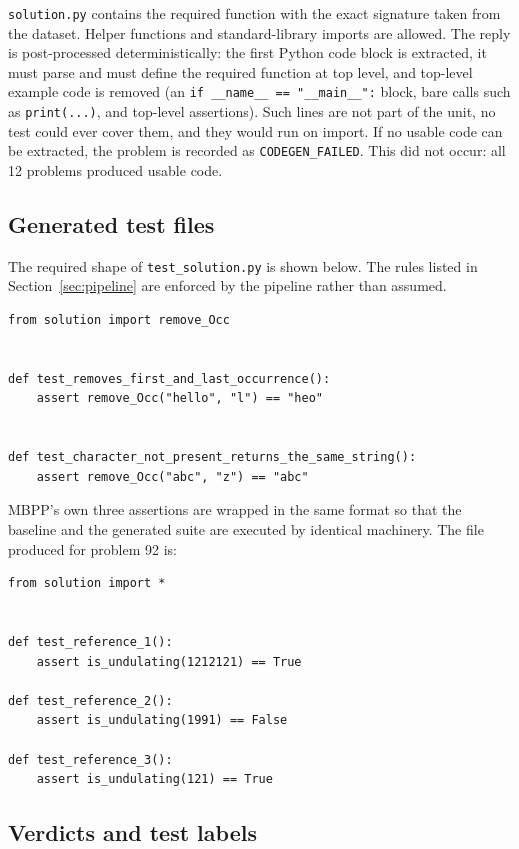 \documentclass[11pt,a4paper]{article}
\begin{document}
\texttt{solution.py} contains the required function with the exact signature taken from the dataset. Helper
functions and standard-library imports are allowed. The reply is post-processed deterministically: the first
Python code block is extracted, it must parse and must define the required function at top level, and
top-level example code is removed (an \texttt{if \_\_name\_\_ == "\_\_main\_\_":} block, bare calls such as
\texttt{print(...)}, and top-level assertions). Such lines are not part of the unit, no test could ever cover
them, and they would run on import. If no usable code can be extracted, the problem is recorded as
\texttt{CODEGEN\_FAILED}. This did not occur: all 12 problems produced usable code.

\subsection{Generated test files}

The required shape of \texttt{test\_solution.py} is shown below. The rules listed in
Section~\ref{sec:pipeline} are enforced by the pipeline rather than assumed.

\begin{lstlisting}[style=py]
from solution import remove_Occ


def test_removes_first_and_last_occurrence():
    assert remove_Occ("hello", "l") == "heo"


def test_character_not_present_returns_the_same_string():
    assert remove_Occ("abc", "z") == "abc"
\end{lstlisting}

MBPP's own three assertions are wrapped in the same format so that the baseline and the generated suite are
executed by identical machinery. The file produced for problem 92 is:

\begin{lstlisting}[style=py]
from solution import *


def test_reference_1():
    assert is_undulating(1212121) == True

def test_reference_2():
    assert is_undulating(1991) == False

def test_reference_3():
    assert is_undulating(121) == True
\end{lstlisting}

\subsection{Verdicts and test labels}
\end{document}

